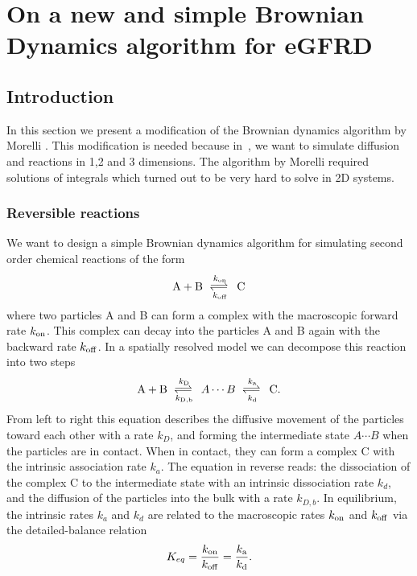 \section{On a new and simple Brownian Dynamics algorithm for eGFRD}

\subsection{Introduction}

In this section we present a modification of the Brownian dynamics algorithm by Morelli \cite{Morelli2008a}. This modification is needed because in \GFRD\,, we want to simulate diffusion and reactions in 1,2 and 3 dimensions. The algorithm by Morelli required solutions of integrals which turned out to be very hard to solve in 2D systems.

\subsubsection{Reversible reactions}
We want to design a simple Brownian dynamics algorithm for simulating second order chemical reactions of the form
\begin{equation}
{\rm A} + {\rm B} \rates{k_{\rm on}}{k_{\rm off}} {\rm C}
\end{equation}
where two particles A and B can form a complex with the macroscopic forward rate $k_{\rm on}$. This complex can decay into the particles A and B again with the backward rate $k_{\rm off}$. In a spatially resolved model we can decompose this reaction into two steps \cite{Agmon1990}
\begin{equation}
{\rm A} + {\rm B} \rates{k_{\rm D}}{k_{\rm D,b}} A \cdots B \rates{k_{\rm a}}{k_{\rm d}} {\rm C}.
\end{equation}
From left to right this equation describes the diffusive movement of the particles toward each other with a rate $k_D$, and forming the intermediate state $A \cdots B$ when the particles are in contact.  When in contact, they can form a complex C with the intrinsic association rate $k_a$. The equation in reverse reads: the dissociation of the complex C to the intermediate state with an intrinsic dissociation rate $k_d$, and the diffusion of the particles into the bulk with a rate $k_{D,b}$. In equilibrium, the intrinsic rates $k_a$ and $k_d$ are related to the macroscopic rates $k_{\rm on}$ and $k_{\rm off}$ via the detailed-balance relation
\begin{equation}
K_{eq} = \frac{k_{\rm on}}{k_{\rm off}} = \frac{k_{\rm a}}{k_{\rm d}}.
\end{equation}

